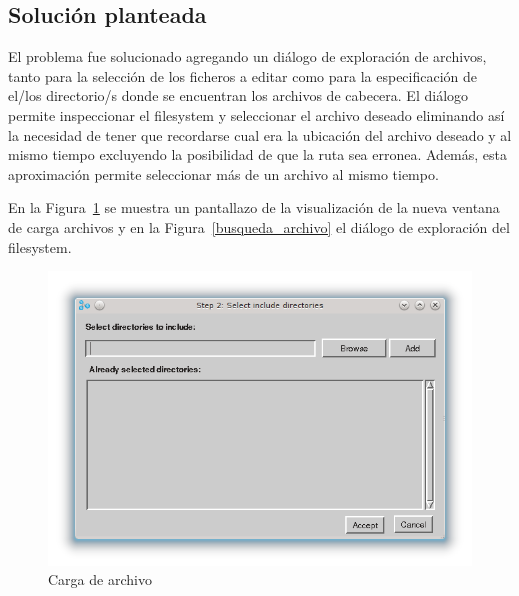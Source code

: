 \documentclass[a4paper,oneside,12pt]{article}
\begin{document}
\subsection{Soluci\'on planteada}
El problema fue solucionado agregando un di\'alogo de exploraci\'on de archivos, tanto para la selecci\'on de los ficheros a editar como para la especificaci\'on de el/los directorio/s donde se encuentran los archivos de cabecera. El di\'alogo permite inspeccionar el filesystem y seleccionar el archivo deseado eliminando as\'i la necesidad de tener que recordarse cual era la ubicaci\'on del archivo deseado y al mismo tiempo excluyendo la posibilidad de que la ruta sea erronea. Adem\'as, esta aproximaci\'on permite seleccionar m\'as de un archivo al mismo tiempo.

En la Figura~\ref{carga_archivo} se muestra un pantallazo de la visualizaci\'on de la nueva ventana de carga archivos y en la Figura~\ref{busqueda_archivo} el di\'alogo de exploraci\'on del filesystem.

\begin{figure}[h!]
  \centering
    \includegraphics[scale=0.50]{images/codigo_modificado/include.png}
     \caption{Carga de archivo}
     \label{carga_archivo}
\end{figure}
\end{document}
